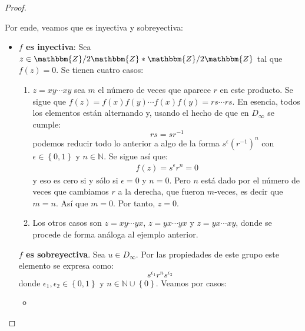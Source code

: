 \documentclass[12pt]{report}
\newcounter{it}
\theoremstyle{largebreak}
\newcommand{\bbm}[1]{\ensuremath{\mathbbm{#1}}}
\begin{document}
\begin{proof}
\begin{itemize}
            Por ende, veamos que es inyectiva y sobreyectiva:
            \begin{itemize}
                \item \textbf{$f$ es inyectiva}: Sea $z\in\bbm{Z}/2\bbm{Z}*\bbm{Z}/2\bbm{Z}$ tal que $f(z)=0$. Se tienen cuatro casos:
                \begin{enumerate}[label = \textit{(\alph*)}]
                    \item $z=xy\cdots xy$ sea $m$ el número de veces que aparece $r$ en este producto. Se sigue que $f(z)=f(x)f(y)\cdots f(x)f(y)=rs\cdots rs$. En esencia, todos los elementos están alternando y, usando el hecho de que en $D_\infty$ se cumple:
                    \begin{equation*}
                        rs=sr^{-1}
                    \end{equation*}
                    podemos reducir todo lo anterior a algo de la forma $s^{\epsilon}(r^{-1})^n$ con $\epsilon\in\left\{0,1\right\}$ y $n\in\mathbb{N}$. Se sigue así que:
                    \begin{equation*}
                        \begin{split}
                            f(z)=s^{\epsilon}r^n=0
                        \end{split}
                    \end{equation*}
                    y eso es cero si y sólo si $\epsilon=0$ y $n=0$. Pero $n$ está dado por el número de veces que cambiamos $r$ a la derecha, que fueron $m$-veces, es decir que $m=n$. Así que $m=0$. Por tanto, $z=0$.
                    \item Los otros casos son $z=xy\cdots yx$, $z=yx\cdots yx$ y $z=yx\cdots xy$, donde se procede de forma análoga al ejemplo anterior.
                \end{enumerate}
                \textbf{$f$ es sobreyectiva}. Sea $u\in D_\infty$. Por las propiedades de este grupo este elemento se expresa como:
                \begin{equation*}
                    s^{\epsilon_1} r^ns^{\epsilon_2}
                \end{equation*}
                donde $\epsilon_1,\epsilon_2\in\left\{0,1\right\}$ y $n\in\mathbb{N}\cup\left\{0\right\}$. Veamos por casos:
                \begin{itemize}
                    \item 
                \end{itemize}
            \end{itemize}
        \end{itemize}
    \end{proof}
\end{document}
